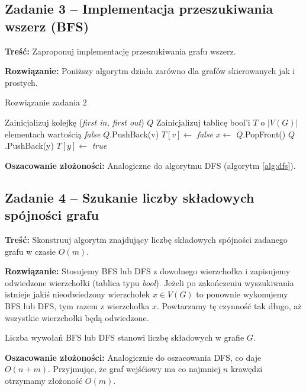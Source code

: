 \subsection{Zadanie 3 -- Implementacja przeszukiwania wszerz (BFS)}

\textbf{Treść: } Zaproponuj implementację
przeszukiwania grafu wszerz.

\textbf{Rozwiązanie:}
Poniższy algorytm działa zarówno dla grafów skierowanych
jak i prostych.

\begin{algorithm}[H]
	\caption{Rozwiązanie zadania 2}\label{Zadanie23}
	\begin{algorithmic}[1]
		\State Zainicjalizuj kolejkę (\textit{first in, first out}) $Q$
		\State Zainicjalizuj tablicę bool'i $T$ o $|V(G)|$ elementach wartością 
		\textit{false}
		\State $Q$.PushBack(v)
		\State $T[v] \gets$ \textit{false}
		\State $x \gets$ $Q$.PopFront()
		\State $Q$.PushBack(y)
		\State $T[y] \gets$ \textit{true} 
		\EndIf
		\EndWhile
		\EndWhile
		\EndProcedure
	\end{algorithmic}
\end{algorithm}

\textbf{Oszacowanie złożoności:} Analogiczne do algorytmu DFS (algorytm \ref{alg:dfs}).

\subsection{Zadanie 4 -- Szukanie liczby składowych spójności grafu}
\textbf{Treść: } Skonstruuj algorytm znajdujący liczbę składowych 
spójności zadanego grafu w czasie $O(m)$.

\textbf{Rozwiązanie: } Stosujemy BFS lub DFS z dowolnego 
wierzchołka i zapisujemy odwiedzone wierzchołki (tablica typu \textit{bool}).
Jeżeli po zakończeniu wyszukiwania istnieje jakiś nieodwiedzony wierzchołek $x \in V(G)$ 
to ponownie wykonujemy BFS lub DFS, tym razem z wierzchołka $x$.
Powtarzamy tę czynność tak długo, aż wszystkie wierzchołki będą odwiedzone. 

Liczba wywołań BFS lub DFS stanowi liczbę składowych w grafie $G$.

\textbf{Oszacowanie złożoności:} Analogicznie do oszacowania DFS, co daje $O(n + m)$. Przyjmując, że
graf wejśćiowy ma co najmniej $n$ krawędzi otrzymamy złożoność  $O(m)$.

